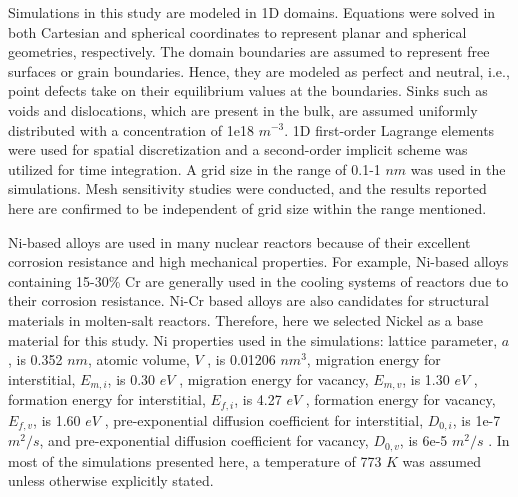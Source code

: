 \documentclass[utf8]{frontiersSCNS} %
\begin{document}
    Simulations in this study are modeled in 1D domains. Equations were solved in both Cartesian and spherical coordinates to represent planar and spherical geometries, respectively. The domain boundaries are assumed to represent free surfaces or grain boundaries. Hence, they are modeled as perfect and neutral, i.e., point defects take on their equilibrium values at the boundaries. Sinks such as voids and dislocations, which are present in the bulk, are assumed uniformly distributed with a concentration of 1e18 $m^{-3}$. 1D first-order Lagrange elements were used for spatial discretization and a second-order implicit scheme was utilized for time integration. A grid size in the range of 0.1-1 $nm$ was used in the simulations. Mesh sensitivity studies were conducted, and the results reported here are confirmed to be independent of grid size within the range mentioned.
    
    Ni-based alloys are used in many nuclear reactors because of their excellent corrosion resistance and high mechanical properties. For example, Ni-based alloys containing 15-30\% Cr are generally used in the cooling systems of reactors due to their corrosion resistance. Ni-Cr based alloys are also candidates for structural materials in molten-salt reactors. Therefore, here we selected Nickel as a base material for this study. Ni properties used in the simulations: lattice parameter, $a$, is 0.352 $nm$, atomic volume, $V$ , is 0.01206 $nm^3$, migration energy for interstitial, $E_{m,i}$, is 0.30 $eV$ , migration energy for vacancy, $E_{m,v}$, is 1.30 $eV$ , formation energy for interstitial, $E_{f,i}$, is 4.27 $eV$ , formation energy for vacancy, $E_{f,v}$, is 1.60 $eV$ , pre-exponential diffusion coefficient for interstitial, $D_{0,i}$, is 1e-7 $m^2/s$, and pre-exponential diffusion coefficient for vacancy, $D_{0,v}$, is 6e-5 $m^2/s$ \citep{walgraef1996,zhao2016}. In most of the simulations presented here, a temperature of 773 $K$ was assumed unless otherwise explicitly stated.
    
\end{document}

